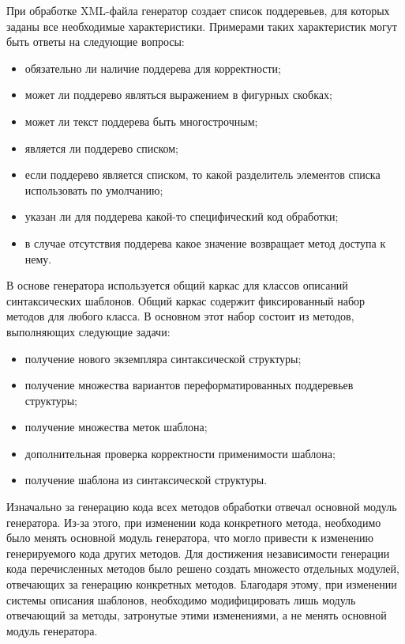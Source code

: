 При обработке XML-файла генератор создает список поддеревьев, для которых заданы все необходимые характеристики. Примерами таких характеристик могут быть ответы на следующие вопросы: 
\begin{itemize}
\item обязательно ли наличие поддерева для корректности;
\item может ли поддерево являться выражением в фигурных скобках;
\item может ли текст поддерева быть многострочным;
\item является ли поддерево списком;
\item если поддерево является списком, то какой разделитель элементов списка использовать по умолчанию;
\item указан ли для поддерева какой-то специфический код обработки;
\item в случае отсутствия поддерева какое значение возвращает метод доступа к нему.
\end{itemize}

В основе генератора используется общий каркас для классов описаний синтаксических шаблонов. Общий каркас содержит фиксированный набор методов для любого класса. В основном этот набор состоит из методов, выполняющих следующие задачи:
\begin{itemize}
\item получение нового экземпляра синтаксической структуры;
\item получение множества вариантов переформатированных поддеревьев структуры;
\item получение множества меток шаблона;
\item дополнительная проверка корректности применимости шаблона;
\item получение шаблона из синтаксической структуры.
\end{itemize}

Изначально за генерацию кода всех методов обработки отвечал основной модуль генератора. Из-за этого, при изменении кода конкретного метода, необходимо было менять основной модуль генератора, что могло привести к изменению генерируемого кода других методов. Для достижения независимости генерации кода перечисленных методов было решено создать множесто отдельных модулей, отвечающих за генерацию конкретных методов. Благодаря этому, при изменении системы описания шаблонов, необходимо модифицировать лишь модуль отвечающий за методы, затронутые этими изменениями, а не менять основной модуль генератора. 

